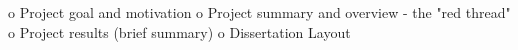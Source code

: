 o   Project goal and motivation
o   Project summary and overview - the "red thread"
o   Project results (brief summary)
o   Dissertation Layout